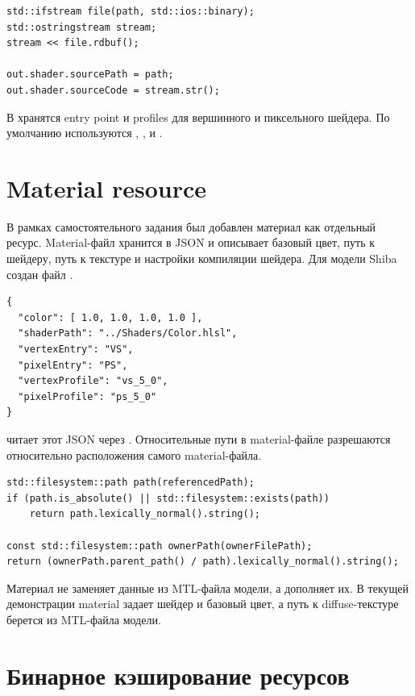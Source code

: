 \documentclass[14pt,a4paper]{extarticle}
\begin{document}
\begin{lstlisting}[style=cppgost,caption={Чтение исходного кода шейдера}]
std::ifstream file(path, std::ios::binary);
std::ostringstream stream;
stream << file.rdbuf();

out.shader.sourcePath = path;
out.shader.sourceCode = stream.str();
\end{lstlisting}

В  хранятся entry point и profiles для вершинного и пиксельного шейдера. По
умолчанию используются , ,  и .

\section{Material resource}

В рамках самостоятельного задания был добавлен материал как отдельный ресурс. Material-файл хранится в JSON
и описывает базовый цвет, путь к шейдеру, путь к текстуре и настройки компиляции шейдера. Для модели Shiba
создан файл .

\begin{lstlisting}[style=jsongost,caption={Пример material-файла Shiba}]
{
  "color": [ 1.0, 1.0, 1.0, 1.0 ],
  "shaderPath": "../Shaders/Color.hlsl",
  "vertexEntry": "VS",
  "pixelEntry": "PS",
  "vertexProfile": "vs_5_0",
  "pixelProfile": "ps_5_0"
}
\end{lstlisting}

 читает этот JSON через . Относительные пути в material-файле
разрешаются относительно расположения самого material-файла.

\begin{lstlisting}[style=cppgost,caption={Разрешение относительных путей material-файла}]
std::filesystem::path path(referencedPath);
if (path.is_absolute() || std::filesystem::exists(path))
    return path.lexically_normal().string();

const std::filesystem::path ownerPath(ownerFilePath);
return (ownerPath.parent_path() / path).lexically_normal().string();
\end{lstlisting}

Материал не заменяет данные из MTL-файла модели, а дополняет их. В текущей демонстрации material задает
шейдер и базовый цвет, а путь к diffuse-текстуре берется из MTL-файла модели.

\section{Бинарное кэширование ресурсов}
\end{document}
